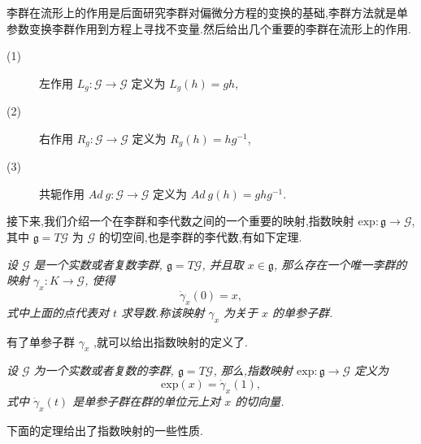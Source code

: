 李群在流形上的作用是后面研究李群对偏微分方程的变换的基础,李群方法就是单参数变换李群作用到方程上寻找不变量.然后给出几个重要的李群在流形上的作用.
\begin{description}
	\item[(1)] 左作用 $L_g : \mathcal{G} \to \mathcal{G}$ 定义为 $L_g (h) = gh$,
	\item[(2)] 右作用 $R_g : \mathcal{G} \to \mathcal{G}$ 定义为 $R_g (h) = hg^{-1}$,
	\item[(3)] 共轭作用 $Ad~g: \mathcal{G} \to \mathcal{G}$ 定义为 $Ad~g(h) = ghg^{−1}$.
\end{description}

接下来,我们介绍一个在李群和李代数之间的一个重要的映射,指数映射 $\mathrm{exp}: \mathfrak{g}\to \mathcal{G}$, 其中 $\mathfrak{g}=T\mathcal{G}$ 为 $\mathcal{G}$ 的切空间,也是李群的李代数,有如下定理.
\begin{theorem}
	\emph{设 $\mathcal{G}$ 是一个实数或者复数李群, $\mathfrak{g}=T\mathcal{G}$, 并且取 $x\in\mathfrak{g}$, 那么存在一个唯一李群的映射 $\gamma_x : K \to \mathcal{G}$, 使得
	\begin{equation*}
		\dot{\gamma}_x(0)=x,
	\end{equation*}
式中上面的点代表对 $t$ 求导数.称该映射 $\gamma_x$ 为关于 $x$ 的单参子群.}
\end{theorem}

有了单参子群 $\gamma_x$ ,就可以给出指数映射的定义了.
\begin{definition}
	\emph{设 $\mathcal{G}$ 为一个实数或者复数的李群, $\mathfrak{g}=T\mathcal{G}$, 那么,指数映射 $\mathrm{exp}: \mathfrak{g}\to \mathcal{G}$ 定义为
	\begin{equation*}
		\mathrm{exp}(x)=\dot{\gamma}_x(1),
	\end{equation*}
	式中 $\dot{\gamma}_x(t)$ 是单参子群在群的单位元上对 $x$ 的切向量.}
\end{definition}

下面的定理给出了指数映射的一些性质.

